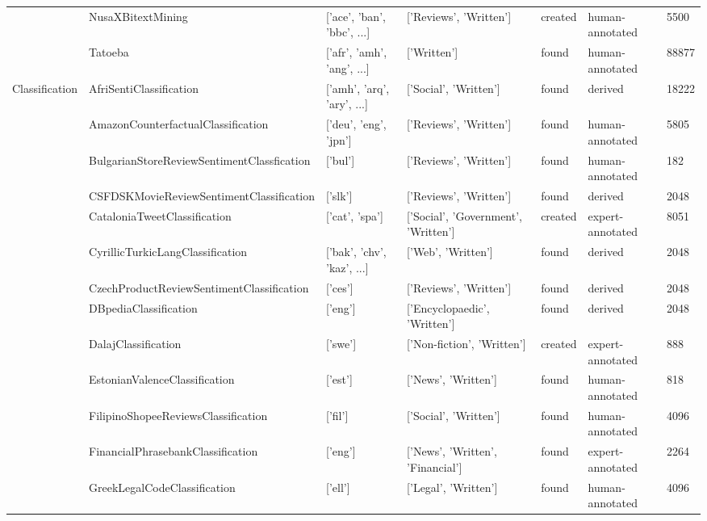 \begin{table*}[!htb]
{\begin{tabular}{lllllll}
     & NusaXBitextMining \cite{winata2023nusax} & ['ace', 'ban', 'bbc', ...] & ['Reviews', 'Written'] & created & human-annotated & 5500 \\
     & Tatoeba \cite{tatoeba} & ['afr', 'amh', 'ang', ...] & ['Written'] & found & human-annotated & 88877 \\
    \cline{1-7}
    \multirow[t]{43}{*}{Classification} & AfriSentiClassification \cite{Muhammad2023AfriSentiAT} & ['amh', 'arq', 'ary', ...] & ['Social', 'Written'] & found & derived & 18222 \\
     & AmazonCounterfactualClassification \cite{oneill-etal-2021-wish} & ['deu', 'eng', 'jpn'] & ['Reviews', 'Written'] & found & human-annotated & 5805 \\
     & BulgarianStoreReviewSentimentClassfication \cite{DVN/TXIK9P_2018} & ['bul'] & ['Reviews', 'Written'] & found & human-annotated & 182 \\
     & CSFDSKMovieReviewSentimentClassification \cite{stefanik2023resources} & ['slk'] & ['Reviews', 'Written'] & found & derived & 2048 \\
     & CataloniaTweetClassification \cite{zotova-etal-2020-multilingual} & ['cat', 'spa'] & ['Social', 'Government', 'Written'] & created & expert-annotated & 8051 \\
     & CyrillicTurkicLangClassification \cite{goldhahn2012building} & ['bak', 'chv', 'kaz', ...] & ['Web', 'Written'] & found & derived & 2048 \\
     & CzechProductReviewSentimentClassification \cite{habernal-etal-2013-sentiment} & ['ces'] & ['Reviews', 'Written'] & found & derived & 2048 \\
     & DBpediaClassification \cite{NIPS2015_250cf8b5} & ['eng'] & ['Encyclopaedic', 'Written'] & found & derived & 2048 \\
     & DalajClassification \cite{2105.06681} & ['swe'] & ['Non-fiction', 'Written'] & created & expert-annotated & 888 \\
     & EstonianValenceClassification \cite{Pajupuu2023} & ['est'] & ['News', 'Written'] & found & human-annotated & 818 \\
     & FilipinoShopeeReviewsClassification \cite{riegoenhancement} & ['fil'] & ['Social', 'Written'] & found & human-annotated & 4096 \\
     & FinancialPhrasebankClassification \cite{Malo2014GoodDO} & ['eng'] & ['News', 'Written', 'Financial'] & found & expert-annotated & 2264 \\
     & GreekLegalCodeClassification \cite{papaloukas-etal-2021-glc} & ['ell'] & ['Legal', 'Written'] & found & human-annotated & 4096 \\

\end{tabular}}
\end{table*}
